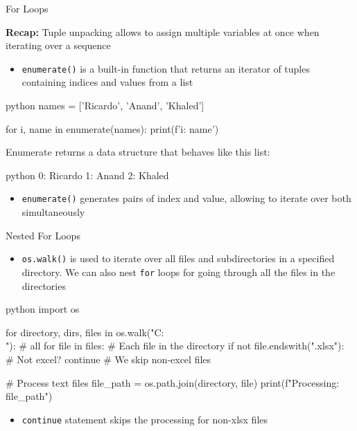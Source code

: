 \documentclass[
	11pt, 
]{beamer}
\begin{document}
\begin{frame}[fragile]{For Loops}

\textbf{Recap:} Tuple unpacking allows to assign multiple variables at once when iterating over a sequence

\begin{itemize}
    \item \texttt{enumerate()} is a built-in function that returns an iterator of tuples containing indices and values from a list
\end{itemize}

\begin{mintedbox}{python}
names = ['Ricardo', 'Anand', 'Khaled']

for i, name in enumerate(names):
print(f'{i}: {name}')
\end{mintedbox}

Enumerate returns a data structure that behaves like this list:

\begin{mintedbox}{python}
0: Ricardo
1: Anand
2: Khaled
\end{mintedbox}

\begin{itemize}
    \item \texttt{enumerate()} generates pairs of index and value, allowing to iterate over both simultaneously
\end{itemize}

\end{frame}


\begin{frame}[fragile]{Nested For Loops}

\begin{itemize}
    \item \texttt{os.walk()} is used to iterate over all files and subdirectories in a specified directory. We can also nest \texttt{for} loops for going through all the files in the directories
\end{itemize}

\begin{mintedbox}{python}
import os

for directory, dirs, files in os.walk("C:\\"): # all
    for file in files: # Each file in the directory
        if not file.endswith(".xlsx"): # Not excel?
            continue # We skip non-excel files
        
        # Process text files
        file_path = os.path.join(directory, file)
        print(f"Processing: {file_path}")
\end{mintedbox}

\begin{itemize}
    \item \texttt{continue} statement skips the processing for non-xlsx files
\end{itemize}

\end{frame}
\end{document}
